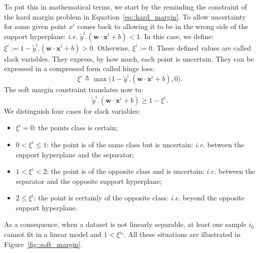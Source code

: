                 To put this in mathematical terms, we start by the reminding the constraint of the hard margin problem in Equation~\ref{eq::hard_margin}.
                To allow uncertainty for some given point $x^i$ comes back to allowing it to be in the wrong side of the support hyperplane: \textit{i.e.} $\tilde{y}^l.(\bm{w}\cdot\bm{x}^l + b) < 1$.
                In this case, we define: $\xi^i := 1 - \tilde{y}^i.(\bm{w}\cdot\bm{x}^i + b) > 0$.
                Otherwise, $\xi^i := 0$.
                These defined values are called slack variables.
                They express, by how much, each point is uncertain.
                They can be expressed in a compressed form called hinge loss:
                \begin{equation}
                    \label{eq::slack_variables}
                    \xi^i \triangleq \max\big(1 - \tilde{y}^i.(\bm{w}\cdot\bm{x}^i + b), 0\big).
                \end{equation}
                The soft margin constraint translates now to:
                \begin{equation}
                    \label{eq::soft_margin}
                    \tilde{y}^i.(\bm{w}\cdot\bm{x}^i + b) \geq 1 - \xi^i.
                \end{equation}
                We distinguish four cases for slack variables:
                \begin{itemize}
                    \item $\xi^i = 0$: the points class is certain;
                    \item $0 < \xi^i \leq 1$: the point is of the same class but is uncertain: \textit{i.e.} between the support hyperplane and the separator;
                    \item $1 < \xi^i < 2$: the point is of the opposite class and is uncertain: \textit{i.e.} between the separator and the opposite support hyperplane;
                    \item $2 \leq \xi^i$: the point is certainly of the opposite class: \textit{i.e.} beyond the opposite support hyperplane.
                \end{itemize}
                As a consequence, when a dataset is not linearly separable, at least one sample $i_0$ cannot fit in a linear model and $1 < \xi^{i_0}$.
                All these situations are illustrated in Figure~\ref{fig::soft_margin}.\\

